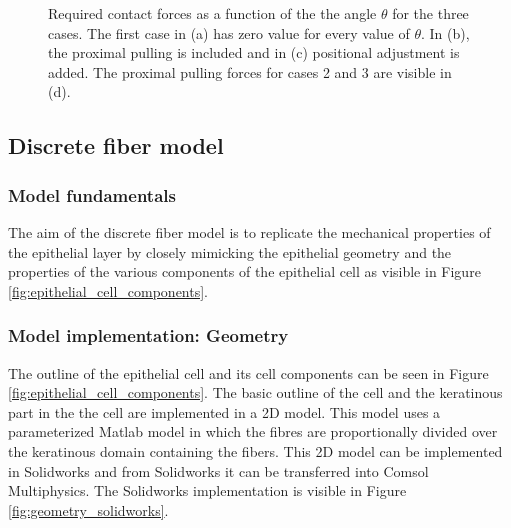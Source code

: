 \begin{figure}[h!]
\begin{subfigure}{0.48\textwidth}
    \caption{}
    \label{fig:pulling}
    \end{subfigure} 
    \caption{Required contact forces as a function of the the angle $\theta$ for the three cases. The first case in (a) has zero value for every value of $\theta$. In (b), the proximal pulling is included and in (c) positional adjustment is added. The proximal pulling forces for cases 2 and 3 are visible in (d).}
    \label{fig:proximal_pulling_cases}
\end{figure}



\subsection{Discrete fiber model}
\subsubsection{Model fundamentals}\label{sec:discrete_model_fundamentals}
The aim of the discrete fiber model is to replicate the mechanical properties of the epithelial layer by closely mimicking the epithelial geometry and the properties of the various components of the epithelial cell as visible in Figure \ref{fig:epithelial_cell_components}. 


\subsubsection{Model implementation: Geometry}\label{sec:discrete_model_geometry}
The outline of the epithelial cell and its cell components can be seen in Figure \ref{fig:epithelial_cell_components}. The basic outline of the cell and the keratinous part in the the cell are implemented in a 2D model. This model uses  a parameterized Matlab model in which the fibres are proportionally divided over the keratinous domain containing the fibers. This 2D model can be implemented in Solidworks and from Solidworks it can be transferred into Comsol Multiphysics. The Solidworks implementation is visible in Figure \ref{fig:geometry_solidworks}.\\ 

